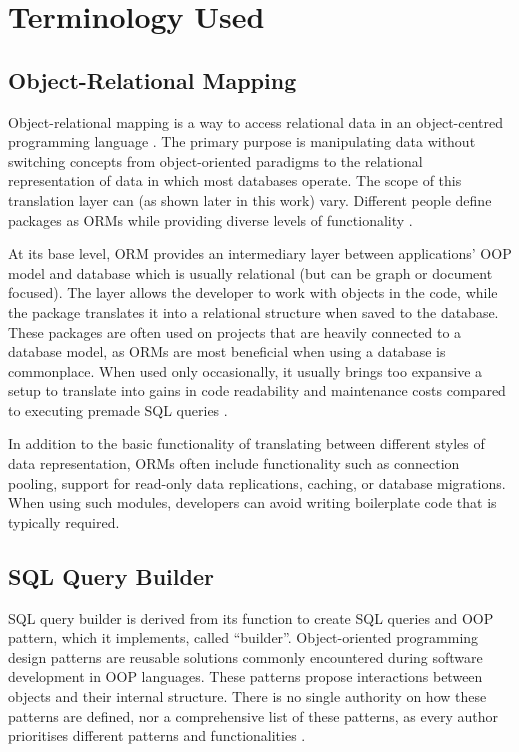 \chapter{Terminology Used}
\section*{Object-Relational Mapping}

Object-relational mapping is a way to access relational data in an
object-centred programming language \cite{agile-mapping-objects}. The primary
purpose is manipulating data without switching concepts from object-oriented
paradigms to the relational representation of data in which most databases
operate. The scope of this translation layer can (as shown later in this work)
vary. Different people define packages as ORMs while providing diverse levels of
functionality \cite{artima-abstractions}.

At its base level, ORM provides an intermediary layer between applications' OOP
model and database which is usually relational (but can be graph or document
focused). The layer allows the developer to work with objects in the code, while
the package translates it into a relational structure when saved to the
database. These packages are often used on projects that are heavily connected
to a database model, as ORMs are most beneficial when using a database is
commonplace. When used only occasionally, it usually brings too expansive a
setup to translate into gains in code readability and maintenance costs compared
to executing premade SQL queries \cite{Torres_Galante_Pimenta_Martins_2017}.

In addition to the basic functionality of translating between different styles
of data representation, ORMs often include functionality such as connection
pooling, support for read-only data replications, caching, or database
migrations. When using such modules, developers can avoid writing boilerplate
code that is typically required.


\section*{SQL Query Builder}

SQL query builder is derived from its function to create SQL queries and OOP
pattern, which it implements, called \enquote{builder}. Object-oriented
programming design patterns are reusable solutions commonly encountered during
software development in OOP languages. These patterns propose interactions
between objects and their internal structure. There is no single authority on
how these patterns are defined, nor a comprehensive list of these patterns, as
every author prioritises different patterns and functionalities
\cite{fowler-patterns-2003}.

